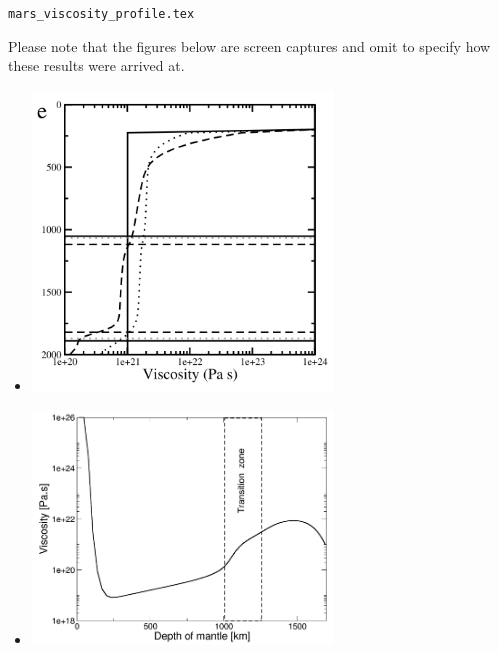 \begin{flushright} {\tiny {\color{gray} \tt mars\_viscosity\_profile.tex}} \end{flushright}

Please note that the figures below are screen captures and omit to 
specify how these results were arrived at. 

\begin{itemize}

\item {}

\begin{center}
\includegraphics[width=8cm]{images/mars/viscosity/rozh06}
\end{center}

\item {}

\begin{center}
\includegraphics[width=8cm]{images/mars/viscosity/keta09}
\end{center}


\end{itemize}
